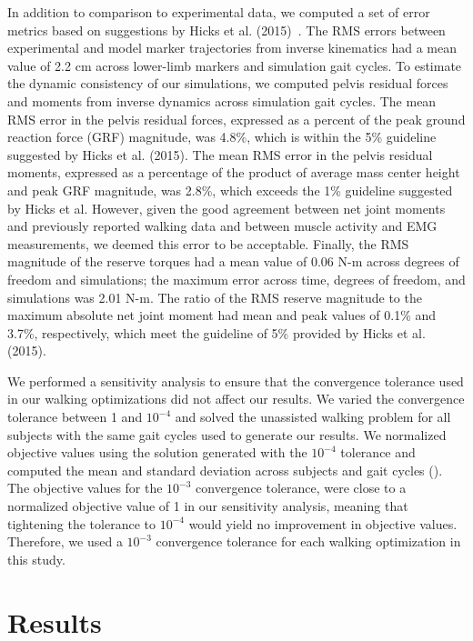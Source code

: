 \documentclass[10pt,letterpaper]{article}
\begin{document}
In addition to comparison to experimental data, we computed a set of error metrics based on suggestions by Hicks et al. (2015)~\cite{Hicks:2015}. The RMS errors between experimental and model marker trajectories from inverse kinematics had a mean value of 2.2 cm across lower-limb markers and simulation gait cycles. To estimate the dynamic consistency of our simulations, we computed pelvis residual forces and moments from inverse dynamics across simulation gait cycles. The mean RMS error in the pelvis residual forces, expressed as a percent of the peak ground reaction force (GRF) magnitude, was 4.8\%, which is within the 5\% guideline suggested by Hicks et al. (2015). The mean RMS error in the pelvis residual moments, expressed as a percentage of the product of average mass center height and peak GRF magnitude, was 2.8\%, which exceeds the 1\% guideline suggested by Hicks et al. However, given the good agreement between net joint moments and previously reported walking data and between muscle activity and EMG measurements, we deemed this error to be acceptable. Finally, the RMS magnitude of the reserve torques had a mean value of 0.06 N-m across degrees of freedom and simulations; the maximum error across time, degrees of freedom, and simulations was 2.01 N-m. The ratio of the RMS reserve magnitude to the maximum absolute net joint moment had mean and peak values of 0.1\% and 3.7\%, respectively, which meet the guideline of 5\% provided by Hicks et al. (2015).

We performed a sensitivity analysis to ensure that the convergence tolerance used in our walking optimizations did not affect our results. We varied the convergence tolerance between 1 and $10^{-4}$ and solved the unassisted walking problem for all subjects with the same gait cycles used to generate our results. We normalized objective values using the solution generated with the $10^{-4}$ tolerance and computed the mean and standard deviation across subjects and gait cycles (). The objective values for the $10^{-3}$ convergence tolerance, were close to a normalized objective value of 1 in our sensitivity analysis, meaning that tightening the tolerance to $10^{-4}$ would yield no improvement in objective values. Therefore, we used a $10^{-3}$ convergence tolerance for each walking optimization in this study.

\section*{Results}
\end{document}
